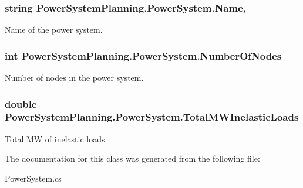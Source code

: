 \subsubsection[{\texorpdfstring{Name}{Name}}]{\setlength{\rightskip}{0pt plus 5cm}string Power\+System\+Planning.\+Power\+System.\+Name\hspace{0.3cm}{\ttfamily [get]}, {\ttfamily [set]}}\hypertarget{class_power_system_planning_1_1_power_system_ae511d3a9d7c871726037041b9fdabe14}{}\label{class_power_system_planning_1_1_power_system_ae511d3a9d7c871726037041b9fdabe14}


Name of the power system. 

\subsubsection[{\texorpdfstring{Number\+Of\+Nodes}{NumberOfNodes}}]{\setlength{\rightskip}{0pt plus 5cm}int Power\+System\+Planning.\+Power\+System.\+Number\+Of\+Nodes\hspace{0.3cm}{\ttfamily [get]}}\hypertarget{class_power_system_planning_1_1_power_system_a3d7abefe87bb1621c5d61644b83ae3d5}{}\label{class_power_system_planning_1_1_power_system_a3d7abefe87bb1621c5d61644b83ae3d5}


Number of nodes in the power system. 

\subsubsection[{\texorpdfstring{Total\+M\+W\+Inelastic\+Loads}{TotalMWInelasticLoads}}]{\setlength{\rightskip}{0pt plus 5cm}double Power\+System\+Planning.\+Power\+System.\+Total\+M\+W\+Inelastic\+Loads\hspace{0.3cm}{\ttfamily [get]}}\hypertarget{class_power_system_planning_1_1_power_system_ade5099d2eb198a61bf794e14ce4b3018}{}\label{class_power_system_planning_1_1_power_system_ade5099d2eb198a61bf794e14ce4b3018}


Total MW of inelastic loads. 



The documentation for this class was generated from the following file\+:\begin{DoxyCompactItemize}
\item 
Power\+System.\+cs\end{DoxyCompactItemize}
